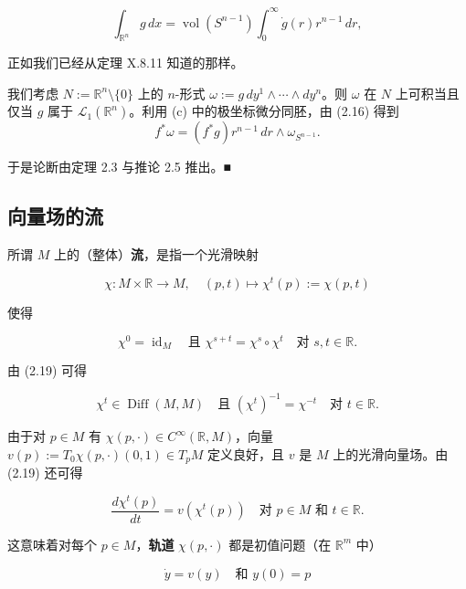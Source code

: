 \begin{example}
\[
\int_{\mathbb{R}^n} g\,dx = \operatorname{vol}(S^{n-1})\int_0^\infty \dot{g}(r)r^{n-1}\,dr ,
\]

正如我们已经从定理 X.8.11 知道的那样。

\proofhead
我们考虑 $ N := \mathbb{R}^n\setminus\{0\} $ 上的 $ n $-形式 $ \omega := g\,dy^1\wedge\cdots\wedge dy^n $。则 $ \omega $ 在 $ N $ 上可积当且仅当 $ g $ 属于 $ \mathcal{L}_1(\mathbb{R}^n) $。利用 (c) 中的极坐标微分同胚，由 (2.16) 得到
\[
f^*\omega = (f^*g)r^{n-1}\,dr\wedge\omega_{S^{n-1}} .
\]

于是论断由定理 2.3 与推论 2.5 推出。\nobreak\hspace{0.35em}■

\end{example}

\subsection*{向量场的流}

所谓 $ M $ 上的（整体）\textbf{流}，是指一个光滑映射

\[
\chi : M\times\mathbb{R}\to M , \quad (p,t)\mapsto \chi^t(p) := \chi(p,t)
\]

使得

\begin{equation}
\chi^0 = \operatorname{id}_M \quad \text{且 } \chi^{s+t} = \chi^s\circ\chi^t \quad \text{对 } s,t \in \mathbb{R} .\tag{2.19}
\end{equation}

由 (2.19) 可得

\[
\chi^t \in \operatorname{Diff}(M,M) \quad \text{且 } (\chi^t)^{-1} = \chi^{-t} \quad \text{对 } t \in \mathbb{R} .
\]

由于对 $ p \in M $ 有 $ \chi(p,\cdot) \in C^\infty(\mathbb{R},M) $，向量 $ v(p) := T_0\chi(p,\cdot)(0,1) \in T_pM $ 定义良好，且 $ v $ 是 $ M $ 上的光滑向量场。由 (2.19) 还可得

\begin{equation}
\frac{d\chi^t(p)}{dt} = v(\chi^t(p)) \quad \text{对 } p \in M \text{ 和 } t \in \mathbb{R} .\tag{2.20}
\end{equation}

这意味着对每个 $ p \in M $，\textbf{轨道} $ \chi(p,\cdot) $ 都是初值问题（在 $ \mathbb{R}^m $ 中）

\begin{equation}
\dot{y} = v(y) \quad \text{和 } y(0) = p\tag{2.21}
\end{equation}

